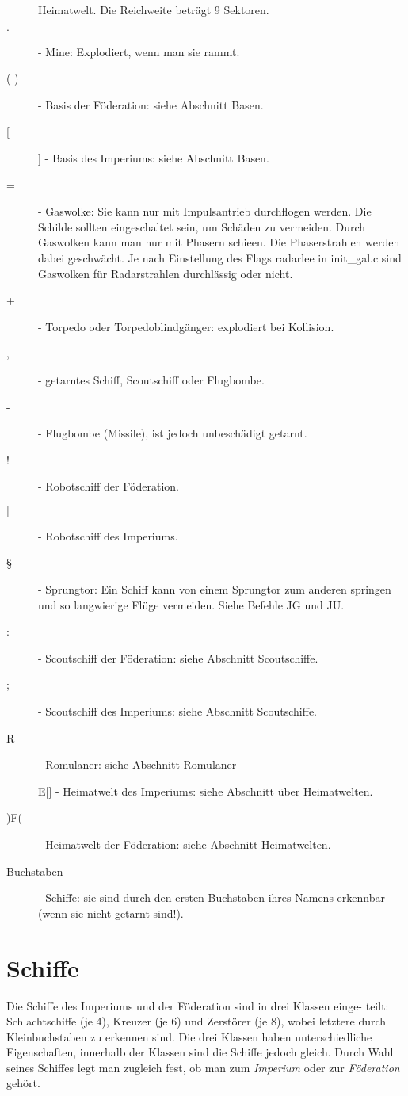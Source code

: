 \begin{description}
            Heimatwelt. Die 
            Reichweite betr\"agt 9 Sektoren.
\item[$\cdot$] - Mine: Explodiert, wenn man sie rammt.
\item[( )] - Basis der F\"oderation: siehe Abschnitt Basen.
\item[[ ]] - Basis des Imperiums: siehe Abschnitt Basen.
\item[=] - Gaswolke: Sie kann nur mit Impulsantrieb durchflogen werden. 
           Die Schilde sollten eingeschaltet sein, um Sch\"aden zu vermeiden. 
           Durch Gaswolken kann man nur mit Phasern schie\3en. 
           Die Phaserstrahlen werden dabei geschw\"acht. Je nach Einstellung
           des Flags radarlee in init\_gal.c sind Gaswolken f\"ur Radarstrahlen
           durchl\"assig oder nicht.
\item[+] - Torpedo oder Torpedoblindg\"anger: explodiert bei Kollision.
\item[,] - getarntes Schiff, Scoutschiff oder Flugbombe.
\item[-] - Flugbombe (Missile), ist jedoch unbesch\"adigt getarnt.
\item[!] - Robotschiff der F\"oderation.
\item[$|$] - Robotschiff des Imperiums.
\item [\S] - Sprungtor: Ein Schiff kann von einem Sprungtor zum anderen
             springen und so langwierige Fl\"uge vermeiden. Siehe Befehle
             JG und JU.
\item[:] - Scoutschiff der F\"oderation: siehe Abschnitt Scoutschiffe.
\item[;] - Scoutschiff des Imperiums: siehe Abschnitt Scoutschiffe.
\item[R] - Romulaner: siehe Abschnitt Romulaner
\item[]E[] - Heimatwelt des Imperiums: 
               siehe Abschnitt \"uber Heimatwelten.
\item[)F(] - Heimatwelt der F\"oderation: siehe Abschnitt Heimatwelten.
\item[Buchstaben] - Schiffe: sie sind durch den ersten Buchstaben ihres Namens
                    erkennbar (wenn sie nicht getarnt sind!).
\end{description}

\section{Schiffe}

Die Schiffe des Imperiums und der F\"oderation sind in drei Klassen einge-
teilt: Schlachtschiffe (je 4), Kreuzer (je 6) und Zerst\"orer (je 8), wobei
letztere durch Kleinbuchstaben zu erkennen sind. Die drei Klassen haben
unterschiedliche Eigenschaften, innerhalb der Klassen sind die Schiffe
jedoch gleich. Durch Wahl seines Schiffes legt man zugleich fest, ob man zum
{\sl Imperium} oder zur {\sl F\"oderation} geh\"ort.\\

